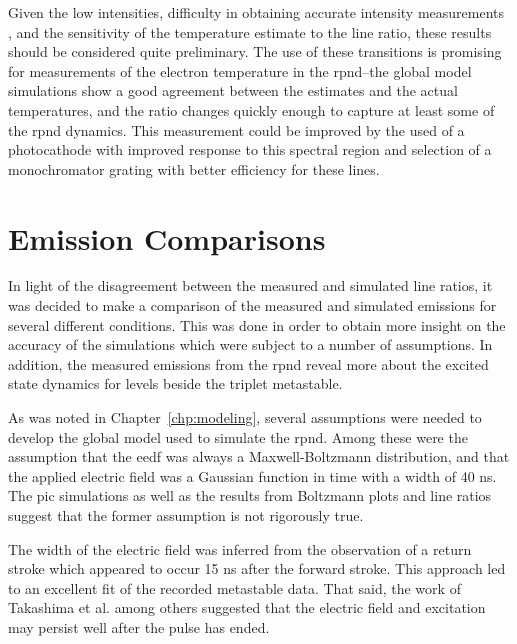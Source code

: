 Given the low intensities, difficulty in obtaining accurate intensity
measurements \cite{Griem2005}, and the sensitivity of the temperature estimate
to the line ratio, these results should be considered quite preliminary. The use
of these transitions is promising for measurements of the electron temperature
in the \acs{rpnd}--the global model simulations show a good agreement between
the estimates and the actual temperatures, and the ratio changes quickly enough
to capture at least some of the \acs{rpnd} dynamics. This measurement could be
improved by the used of a photocathode with improved response to this spectral
region and selection of a monochromator grating with better efficiency for these
lines.

\section{Emission Comparisons}

In light of the disagreement between the measured and simulated line ratios, it
was decided to make a comparison of the measured and simulated emissions for
several different conditions. This was done in order to obtain more insight on
the accuracy of the simulations which were subject to a number of assumptions.
In addition, the measured emissions from the \acs{rpnd} reveal more about the
excited state dynamics for levels beside the triplet metastable.

As was noted in Chapter~\ref{chp:modeling}, several assumptions were needed to
develop the global model used to simulate the \acs{rpnd}. Among these were the
assumption that the \acs{eedf} was always a Maxwell-Boltzmann distribution, and
that the applied electric field was a Gaussian function in time with a width of
40 ns. The \acs{pic} simulations as well as the results from Boltzmann plots and
line ratios suggest that the former assumption is not rigorously true.

The width of the electric field was inferred from the observation of a return
stroke which appeared to occur 15 ns after the forward stroke. This approach led
to an excellent fit of the recorded metastable data. That said, the work of
Takashima et al. \cite{Takashima2011} among others \cite{Ito2010} suggested that
the electric field and excitation may persist well after the pulse has ended.

